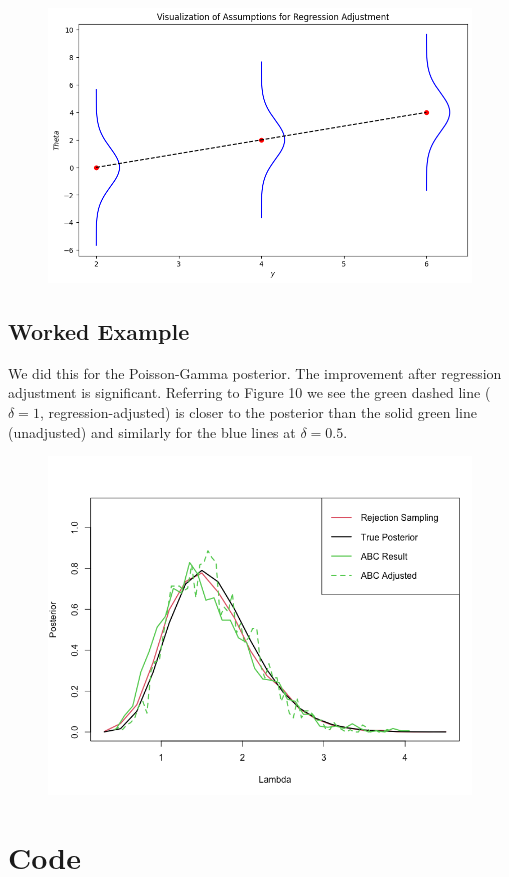 \documentclass{article}
\begin{document}
\begin{figure}
    \centering
    \includegraphics[width=1\linewidth]{overviews/bayesian/ABC/figures/abc_asummp.png}
\end{figure}

\subsection{Worked Example}
We did this for the Poisson-Gamma posterior. The improvement after regression adjustment is significant. Referring to Figure 10 we see the green dashed line ( $\delta=1$, regression-adjusted) is closer to the posterior than the solid green line (unadjusted) and similarly for the blue lines at $\delta=0.5$.

\begin{figure}
    \centering
    \includegraphics[width=1\linewidth]{overviews/bayesian/ABC/figures/abc-comps.png}
\end{figure}

\printbibliography


\newpage
\appendix
\section{Code}
\inputminted[linenos=true]{python}{code/abc_assump.py}
\inputminted[linenos=true]{R}{code/abc-comps.R}
\end{document}
